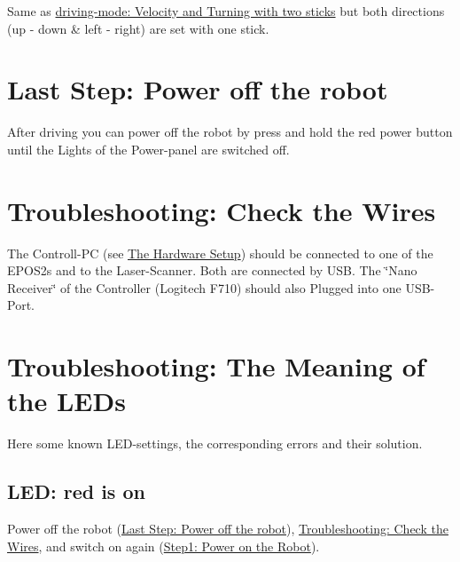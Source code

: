 Same as \hyperlink{page1_mode_twostick}{driving-\/mode\-: Velocity and Turning with two sticks} but both directions (up -\/ down \& left -\/ right) are set with one stick.\hypertarget{page1_power_off}{}\section{Last Step\-: Power off the robot}\label{page1_power_off}
After driving you can power off the robot by press and hold the red power button until the Lights of the Power-\/panel are switched off.\hypertarget{page1_checkWires}{}\section{Troubleshooting\-: Check the Wires}\label{page1_checkWires}
The Controll-\/\-P\-C (see \hyperlink{index_hw_setup}{The Hardware Setup}) should be connected to one of the E\-P\-O\-S2s and to the Laser-\/\-Scanner. Both are connected by U\-S\-B. The \char`\"{}\-Nano Receiver\char`\"{} of the Controller (Logitech F710) should also Plugged into one U\-S\-B-\/\-Port.\hypertarget{page1_checkLEDs}{}\section{Troubleshooting\-: The Meaning of the L\-E\-Ds}\label{page1_checkLEDs}
Here some known L\-E\-D-\/settings, the corresponding errors and their solution.\hypertarget{page1_no_connection}{}\subsection{L\-E\-D\-: red is on}\label{page1_no_connection}
Power off the robot (\hyperlink{page1_power_off}{Last Step\-: Power off the robot}), \hyperlink{page1_checkWires}{Troubleshooting\-: Check the Wires}, and switch on again (\hyperlink{page1_step1}{Step1\-: Power on the Robot}). 
